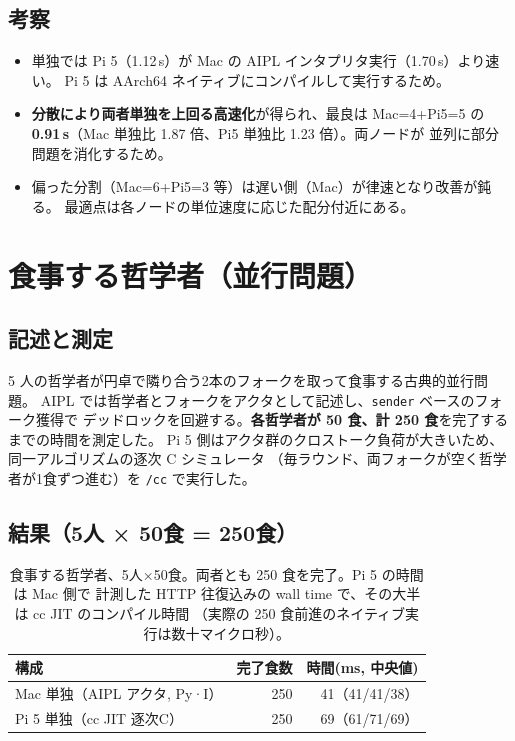 \documentclass[a4paper,11pt]{ltjsarticle}
\newcommand{\cmd}[1]{\texttt{#1}}
\begin{document}
\subsection{考察}
\begin{itemize}[noitemsep]
  \item 単独では Pi 5（1.12\,s）が Mac の AIPL インタプリタ実行（1.70\,s）より速い。
        Pi 5 は AArch64 ネイティブにコンパイルして実行するため。
  \item \textbf{分散により両者単独を上回る高速化}が得られ、最良は Mac=4+Pi5=5 の
        \textbf{0.91\,s}（Mac 単独比 1.87 倍、Pi5 単独比 1.23 倍）。両ノードが
        並列に部分問題を消化するため。
  \item 偏った分割（Mac=6+Pi5=3 等）は遅い側（Mac）が律速となり改善が鈍る。
        最適点は各ノードの単位速度に応じた配分付近にある。
\end{itemize}

\section{食事する哲学者（並行問題）}

\subsection{記述と測定}
5 人の哲学者が円卓で隣り合う2本のフォークを取って食事する古典的並行問題。
AIPL では哲学者とフォークをアクタとして記述し、\cmd{sender} ベースのフォーク獲得で
デッドロックを回避する。\textbf{各哲学者が 50 食、計 250 食}を完了するまでの時間を測定した。
Pi 5 側はアクタ群のクロストーク負荷が大きいため、同一アルゴリズムの逐次 C シミュレータ
（毎ラウンド、両フォークが空く哲学者が1食ずつ進む）を \cmd{/cc} で実行した。

\subsection{結果（5人 × 50食 = 250食）}
\begin{table}[h]\centering
\begin{tabular}{lrr}
\toprule
構成 & 完了食数 & 時間(ms, 中央値) \\
\midrule
Mac 単独（AIPL アクタ, Py·I） & 250 & 41（41/41/38）\\
Pi 5 単独（cc JIT 逐次C）      & 250 & 69（61/71/69）\\
\bottomrule
\end{tabular}
\caption{食事する哲学者、5人×50食。両者とも 250 食を完了。Pi 5 の時間は Mac 側で
計測した HTTP 往復込みの wall time で、その大半は cc JIT のコンパイル時間
（実際の 250 食前進のネイティブ実行は数十マイクロ秒）。}
\end{table}
\end{document}
